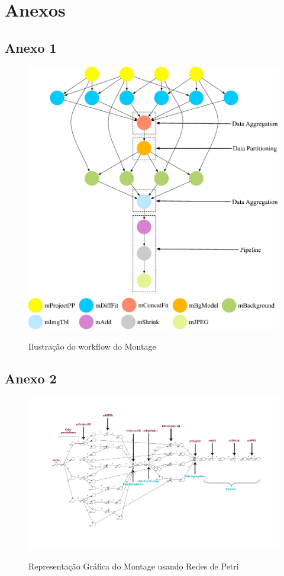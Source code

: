 \section{Anexos}
\subsection{Anexo 1}
	\begin{figure}[!h]
		\centering
		\caption{Ilustração do workflow do Montage}
			\includegraphics[width=1.1\textwidth]{img/Montage.jpg}
		\label{Anexo 1}
	\end{figure}



\subsection{Anexo 2}
\begin{landscape}
	\begin{figure}
		\centering
		\caption{Representação Gráfica do Montage usando Redes de Petri}
		\includegraphics[width=2 \textwidth]{img/RP_montage.jpg}
		\label{Anexo2}
	\end{figure}
\end{landscape}

